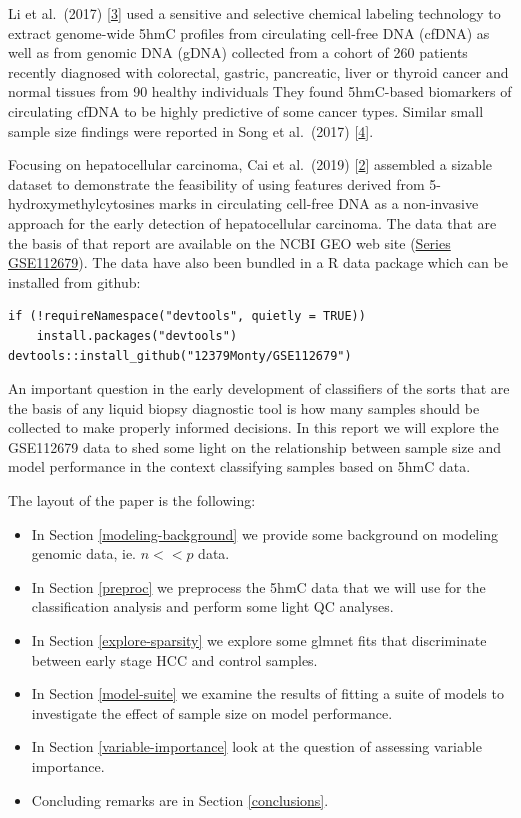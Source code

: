\documentclass[
]{book}
\begin{document}
Li et al.~(2017) {[}\protect\hyperlink{ref-Li:2017aa}{3}{]} used a sensitive and selective chemical labeling technology
to extract genome-wide 5hmC profiles from circulating cell-free DNA (cfDNA)
as well as from genomic DNA (gDNA)
collected from a cohort of 260 patients recently diagnosed with colorectal,
gastric, pancreatic, liver or thyroid cancer and normal tissues from 90 healthy individuals
They found 5hmC-based biomarkers of circulating cfDNA to be highly predictive of some cancer types.
Similar small sample size findings were reported in Song et al.~(2017) {[}\protect\hyperlink{ref-Song:2017aa}{4}{]}.

Focusing on hepatocellular carcinoma, Cai et al.~(2019) {[}\protect\hyperlink{ref-Cai:2019aa}{2}{]} assembled a sizable dataset
to demonstrate the feasibility of using features derived from
5-hydroxymethylcytosines marks in circulating cell-free DNA as
a non-invasive approach for the early detection of
hepatocellular carcinoma. The data that are the basis of that
report are available on the NCBI GEO web site
(\href{https://www.ncbi.nlm.nih.gov/geo/query/acc.cgi?acc=GSE112679}{Series GSE112679}).
The data have also been bundled in a R data package which can be installed from github:

\begin{verbatim}
if (!requireNamespace("devtools", quietly = TRUE))
    install.packages("devtools")
devtools::install_github("12379Monty/GSE112679")
\end{verbatim}

An important question in the early development of classifiers of the sorts
that are the basis of any liquid biopsy diagnostic tool is how many samples
should be collected to make properly informed decisions. In this
report we will explore the GSE112679 data to shed some light on
the relationship between sample size and model performance
in the context classifying samples based on 5hmC data.

The layout of the paper is the following:

\begin{itemize}
\item
  In Section \ref{modeling-background} we provide some background on modeling
  genomic data, ie. \(n << p\) data.
\item
  In Section \ref{preproc} we preprocess the 5hmC data that
  we will use for the classification analysis and perform some light QC analyses.
\item
  In Section \ref{explore-sparsity} we explore some glmnet fits
  that discriminate between early stage HCC and control samples.
\item
  In Section \ref{model-suite} we examine the results of fitting a suite of models to
  investigate the effect of sample size on model performance.
\item
  In Section \ref{variable-importance} look at the question of assessing variable importance.
\item
  Concluding remarks are in Section \ref{conclusions}.
\end{itemize}
\end{document}
